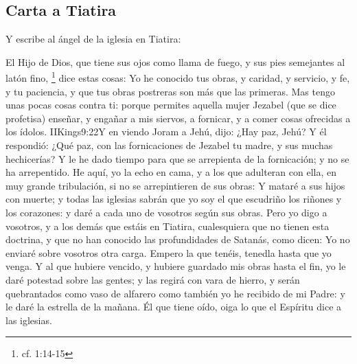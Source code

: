 \subsection*{Carta a Tiatira}
Y escribe al ángel de la iglesia en Tiatira:

El Hijo de Dios, que tiene sus ojos como llama de fuego, y sus pies semejantes al latón fino,%
	\footnote{cf. 1:14-15} %
dice estas cosas:
Yo he conocido tus obras, y caridad, y servicio, y fe, y tu paciencia, y que tus obras postreras son más que las primeras. %
Mas tengo unas pocas cosas contra ti: porque permites aquella mujer Jezabel (que se dice profetisa) enseñar, y engañar a mis siervos, a fornicar, y a comer cosas ofrecidas a los ídolos.%
				 {IIKings}{9:22}{Y en viendo Joram a Jehú, dijo: ¿Hay paz, Jehú? Y él respondió: ¿Qué paz, con las fornicaciones de Jezabel tu madre, y sus muchas hechicerías?}
Y le he dado tiempo para que se arrepienta de la fornicación; y no se ha arrepentido. %
He aquí, yo la echo en cama, y a los que adulteran con ella, en muy grande tribulación, si no se arrepintieren de sus obras: %
Y mataré a sus hijos con muerte; y todas las iglesias sabrán que yo soy el que escudriño los riñones y los corazones:%
 y daré a cada uno de vosotros según sus obras. %
Pero yo digo a vosotros, y a los demás que estáis en Tiatira, cualesquiera que no tienen esta doctrina, y que no han conocido las profundidades de Satanás, como dicen: Yo no enviaré sobre vosotros otra carga. %
Empero la que tenéis, tenedla hasta que yo venga. %
Y al que hubiere vencido, y hubiere guardado mis obras hasta el fin, yo le daré potestad sobre las gentes; %
y las regirá con vara de hierro, y serán quebrantados como vaso de alfarero%
 como también yo he recibido de mi Padre: %
y le daré la estrella de la mañana. %
Él que tiene oído, oiga lo que el Espíritu dice a las iglesias.
